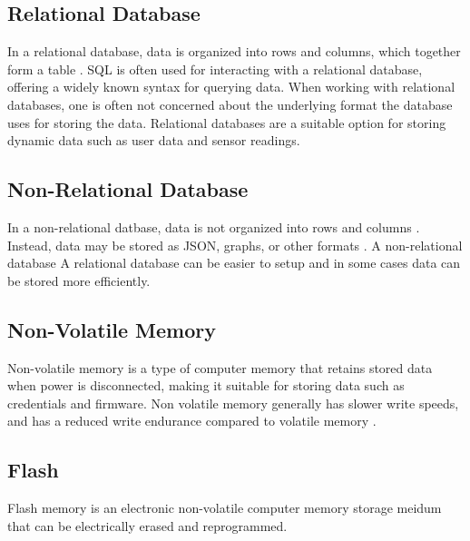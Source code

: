 \documentclass{article}
\begin{document}
\subsection{Relational Database}

In a relational database, data is organized into rows and columns, which together form a table \cite{ibm-rd}.
SQL is often used for interacting with a relational database, offering a widely known syntax for querying data.
When working with relational databases, one is often not concerned about the underlying format the database uses for storing the data.
Relational databases are a suitable option for storing dynamic data such as user data and sensor readings.

\subsection{Non-Relational Database}

In a non-relational datbase, data is not organized into rows and columns \cite{microsoft-nrd}.
Instead, data may be stored as JSON, graphs, or other formats \cite{microsoft-nrd}.
A non-relational database 
A relational database can be easier to setup and in some cases data can be stored more efficiently.

\subsection{Non-Volatile Memory}
Non-volatile memory is a type of computer memory that retains stored data when power is disconnected, making it suitable for storing data such as credentials and firmware.
Non volatile memory generally has slower write speeds, and has a reduced write endurance compared to volatile memory \cite{cintra-2013}.

\subsection{Flash}
Flash memory is an electronic non-volatile computer memory storage meidum that can be electrically erased and reprogrammed.



\clearpage



\end{document}
